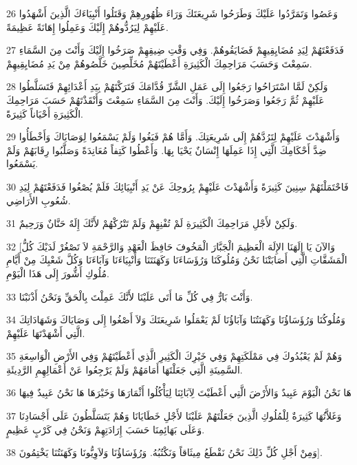 \par 26 وَعَصُوا وَتَمَرَّدُوا عَلَيْكَ وَطَرَحُوا شَرِيعَتَكَ وَرَاءَ ظُهُورِهِمْ وَقَتَلُوا أَنْبِيَاءَكَ الَّذِينَ أَشْهَدُوا عَلَيْهِمْ لِيَرُدُّوهُمْ إِلَيْكَ وَعَمِلُوا إِهَانَةً عَظِيمَةً.
\par 27 فَدَفَعْتَهُمْ لِيَدِ مُضَايِقِيهِمْ فَضَايَقُوهُمْ. وَفِي وَقْتِ ضِيقِهِمْ صَرَخُوا إِلَيْكَ وَأَنْتَ مِنَ السَّمَاءِ سَمِعْتَ وَحَسَبَ مَرَاحِمِكَ الْكَثِيرَةِ أَعْطَيْتَهُمْ مُخَلِّصِينَ خَلَّصُوهُمْ مِنْ يَدِ مُضَايِقِيهِمْ.
\par 28 وَلَكِنْ لَمَّا اسْتَرَاحُوا رَجَعُوا إِلَى عَمَلِ الشَّرِّ قُدَّامَكَ فَتَرَكْتَهُمْ بِيَدِ أَعْدَائِهِمْ فَتَسَلَّطُوا عَلَيْهِمْ ثُمَّ رَجَعُوا وَصَرَخُوا إِلَيْكَ. وَأَنْتَ مِنَ السَّمَاءِ سَمِعْتَ وَأَنْقَذْتَهُمْ حَسَبَ مَرَاحِمِكَ الْكَثِيرَةِ أَحْيَاناً كَثِيرَةً.
\par 29 وَأَشْهَدْتَ عَلَيْهِمْ لِتَرُدَّهُمْ إِلَى شَرِيعَتِكَ. وَأَمَّا هُمْ فَبَغُوا وَلَمْ يَسْمَعُوا لِوَصَايَاكَ وَأَخْطَأُوا ضِدَّ أَحْكَامِكَ الَّتِي إِذَا عَمِلَهَا إِنْسَانٌ يَحْيَا بِهَا. وَأَعْطُوا كَتِفاً مُعَانِدَةً وَصَلَّبُوا رِقَابَهُمْ وَلَمْ يَسْمَعُوا.
\par 30 فَاحْتَمَلْتَهُمْ سِنِينَ كَثِيرَةً وَأَشْهَدْتَ عَلَيْهِمْ بِرُوحِكَ عَنْ يَدِ أَنْبِيَائِكَ فَلَمْ يُصْغُوا فَدَفَعْتَهُمْ لِيَدِ شُعُوبِ الأَرَاضِي.
\par 31 وَلَكِنْ لأَجْلِ مَرَاحِمِكَ الْكَثِيرَةِ لَمْ تُفْنِهِمْ وَلَمْ تَتْرُكْهُمْ لأَنَّكَ إِلَهٌ حَنَّانٌ وَرَحِيمٌ.
\par 32 [وَالآنَ يَا إِلَهَنَا الإِلَهَ الْعَظِيمَ الْجَبَّارَ الْمَخُوفَ حَافِظَ الْعَهْدِ وَالرَّحْمَةِ لاَ تَصْغُرْ لَدَيْكَ كُلُّ الْمَشَقَّاتِ الَّتِي أَصَابَتْنَا نَحْنُ وَمُلُوكَنَا وَرُؤَسَاءَنَا وَكَهَنَتَنَا وَأَنْبِيَاءَنَا وَآبَاءَنَا وَكُلَّ شَعْبِكَ مِنْ أَيَّامِ مُلُوكِ أَشُّورَ إِلَى هَذَا الْيَوْمِ.
\par 33 وَأَنْتَ بَارٌّ فِي كُلِّ مَا أَتَى عَلَيْنَا لأَنَّكَ عَمِلْتَ بِالْحَقِّ وَنَحْنُ أَذْنَبْنَا.
\par 34 وَمُلُوكُنَا وَرُؤَسَاؤُنَا وَكَهَنَتُنَا وَآبَاؤُنَا لَمْ يَعْمَلُوا شَرِيعَتَكَ وَلاَ أَصْغُوا إِلَى وَصَايَاكَ وَشَهَادَاتِكَ الَّتِي أَشْهَدْتَهَا عَلَيْهِمْ.
\par 35 وَهُمْ لَمْ يَعْبُدُوكَ فِي مَمْلَكَتِهِمْ وَفِي خَيْرِكَ الْكَثِيرِ الَّذِي أَعْطَيْتَهُمْ وَفِي الأَرْضِ الْوَاسِعَةِ السَّمِينَةِ الَّتِي جَعَلْتَهَا أَمَامَهُمْ وَلَمْ يَرْجِعُوا عَنْ أَعْمَالِهِمِ الرَّدِيئَةِ.
\par 36 هَا نَحْنُ الْيَوْمَ عَبِيدٌ وَالأَرْضَ الَّتِي أَعْطَيْتَ لِآبَائِنَا لِيَأْكُلُوا أَثْمَارَهَا وَخَيْرَهَا هَا نَحْنُ عَبِيدٌ فِيهَا
\par 37 وَغَلاَّتُهَا كَثِيرَةٌ لِلْمُلُوكِ الَّذِينَ جَعَلْتَهُمْ عَلَيْنَا لأَجْلِ خَطَايَانَا وَهُمْ يَتَسَلَّطُونَ عَلَى أَجْسَادِنَا وَعَلَى بَهَائِمِنَا حَسَبَ إِرَادَتِهِمْ وَنَحْنُ فِي كَرْبٍ عَظِيمٍ.
\par 38 وَمِنْ أَجْلِ كُلِّ ذَلِكَ نَحْنُ نَقْطَعُ مِيثَاقاً وَنَكْتُبُهُ. وَرُؤَسَاؤُنَا وَلاَوِيُّونَا وَكَهَنَتُنَا يَخْتِمُونَ].

